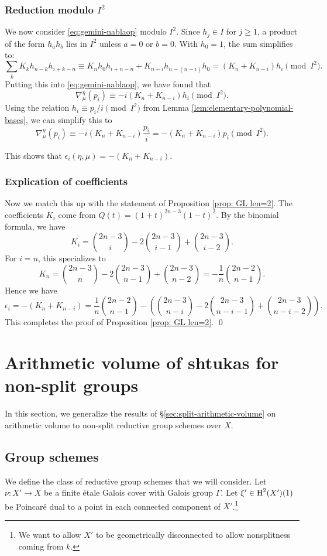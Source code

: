 \documentclass[reqno]{amsart}
\numberwithin{equation}{subsection}
\theoremstyle{definition}
\newcommand{\nablaop}{\nabla^{\eta}_{\mu}}
\newcommand{\cohog}[2]{\textup{H}^{#1}({#2})}     %
\newcommand\G\Gamma
\begin{document}
\subsubsection{Reduction modulo $I^2$}
We now consider \eqref{eq:gemini-nablaop} modulo $I^2$. Since $h_j \in I$ for $j\ge 1$, a product of the form $h_a h_b$ lies in $I^2$ unless $a=0$ or $b=0$. With $h_0=1$, the sum simplifies to:
$$ 
\sum_k K_k h_{n-k} h_{i+k-n} \equiv K_n h_0 h_{i+n-n} + K_{n-i} h_{n-(n-i)} h_0 = (K_n + K_{n-i})h_i \pmod{I^2}. $$
Putting this into \eqref{eq:gemini-nablaop}, we have found that 
$$ \nablaop(p_i) \equiv -i(K_n + K_{n-i})h_i \pmod{I^2}. $$
Using the relation $h_i \equiv p_i/i \pmod{I^2}$ from Lemma \ref{lem:elementary-polynomial-bases}, we can simplify this to 
$$ \nablaop(p_i) \equiv -i(K_n + K_{n-i})\frac{p_i}{i} = -(K_n + K_{n-i})p_i \pmod{I^2}. $$

This shows that $\epsilon_i(\eta, \mu) = -(K_n + K_{n-i})$. 

\subsubsection{Explication of coefficients} Now we match this up with the statement of Proposition \ref{prop: GL len=2}. The coefficients $K_i$ come from $Q(t) = (1+t)^{2n-3}(1-t)^2$. By the binomial formula, we have 
$$ K_i = \binom{2n-3}{i} - 2\binom{2n-3}{i-1} + \binom{2n-3}{i-2}. $$
For $i=n$, this specializes to
$$ K_n = \binom{2n-3}{n} - 2\binom{2n-3}{n-1} + \binom{2n-3}{n-2}  = -\frac{1}{n}\binom{2n-2}{n-1}. $$
Hence we have
$$ \epsilon_i = -(K_n+K_{n-i}) = \frac{1}{n}\binom{2n-2}{n-1} - \left( \binom{2n-3}{n-i} - 2\binom{2n-3}{n-i-1} + \binom{2n-3}{n-i-2} \right). $$ 
This completes the proof of Proposition \ref{prop: GL len=2}. \qed  

\section{Arithmetic volume of shtukas for non-split groups}\label{sec:nonsplit-volume}
In this section, we generalize the results of \S \ref{sec:split-arithmetic-volume} on arithmetic volume to non-split reductive group schemes over $X$. 


\subsection{Group schemes}\label{sssec:non-split-groups} We define the class of reductive group schemes that we will consider. Let $\nu: X'\to X$ be a finite \'etale Galois cover with Galois group $\G$. Let $\xi'\in \cohog{2}{X'}(1)$ be Poincar\'e dual to a point in each connected component of $X'$.\footnote{We want to allow $X'$ to be geometrically disconnected to allow nonsplitness coming from $k$.}
\end{document}
